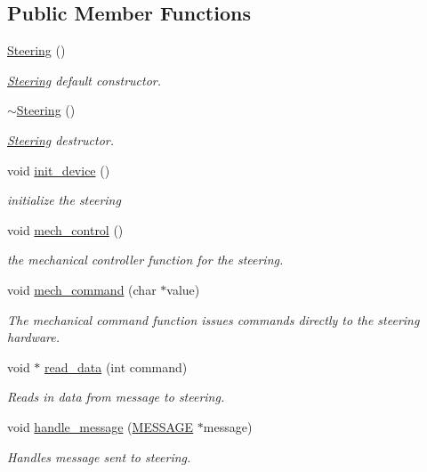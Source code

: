 \subsection*{Public Member Functions}
\begin{DoxyCompactItemize}
\item 
\hyperlink{classSteering_a45a5ff1a1869073a2165680f853b9c41}{Steering} ()
\begin{DoxyCompactList}\small\item\em \hyperlink{classSteering}{Steering} default constructor. \end{DoxyCompactList}\item 
\hyperlink{classSteering_a0cf29a86402af78c57edd2d3aaeaf558}{$\sim$\-Steering} ()
\begin{DoxyCompactList}\small\item\em \hyperlink{classSteering}{Steering} destructor. \end{DoxyCompactList}\item 
void \hyperlink{classSteering_a57a8011d7d5a4ca608b1b140e21233cb}{init\-\_\-device} ()
\begin{DoxyCompactList}\small\item\em initialize the steering \end{DoxyCompactList}\item 
void \hyperlink{classSteering_a5b7b0a053607ad891b7d2826093da6ac}{mech\-\_\-control} ()
\begin{DoxyCompactList}\small\item\em the mechanical controller function for the steering. \end{DoxyCompactList}\item 
void \hyperlink{classSteering_a0ae09490e872d21d211ddfdc446d14d1}{mech\-\_\-command} (char $\ast$value)
\begin{DoxyCompactList}\small\item\em The mechanical command function issues commands directly to the steering hardware. \end{DoxyCompactList}\item 
void $\ast$ \hyperlink{classSteering_afda4f2951e5be114abf988a8e5943a96}{read\-\_\-data} (int command)
\begin{DoxyCompactList}\small\item\em Reads in data from message to steering. \end{DoxyCompactList}\item 
void \hyperlink{classSteering_a29e46d1b87ecda7807452ad67005efe1}{handle\-\_\-message} (\hyperlink{SUBSYS__COMMANDS_8h_ad814416fc1a8c675bea2687d96088a8f}{M\-E\-S\-S\-A\-G\-E} $\ast$message)
\begin{DoxyCompactList}\small\item\em Handles message sent to steering. \end{DoxyCompactList}\end{DoxyCompactItemize}
